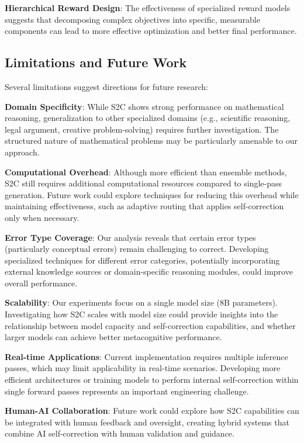 \documentclass[10pt,twocolumn]{article}
\newcommand{\ssc}{\textsc{S2C}}
\begin{document}
\textbf{Hierarchical Reward Design}: The effectiveness of specialized reward models suggests that decomposing complex objectives into specific, measurable components can lead to more effective optimization and better final performance.

\subsection{Limitations and Future Work}

Several limitations suggest directions for future research:

\textbf{Domain Specificity}: While \ssc{} shows strong performance on mathematical reasoning, generalization to other specialized domains (e.g., scientific reasoning, legal argument, creative problem-solving) requires further investigation. The structured nature of mathematical problems may be particularly amenable to our approach.

\textbf{Computational Overhead}: Although more efficient than ensemble methods, \ssc{} still requires additional computational resources compared to single-pass generation. Future work could explore techniques for reducing this overhead while maintaining effectiveness, such as adaptive routing that applies self-correction only when necessary.

\textbf{Error Type Coverage}: Our analysis reveals that certain error types (particularly conceptual errors) remain challenging to correct. Developing specialized techniques for different error categories, potentially incorporating external knowledge sources or domain-specific reasoning modules, could improve overall performance.

\textbf{Scalability}: Our experiments focus on a single model size (8B parameters). Investigating how \ssc{} scales with model size could provide insights into the relationship between model capacity and self-correction capabilities, and whether larger models can achieve better metacognitive performance.

\textbf{Real-time Applications}: Current implementation requires multiple inference passes, which may limit applicability in real-time scenarios. Developing more efficient architectures or training models to perform internal self-correction within single forward passes represents an important engineering challenge.

\textbf{Human-AI Collaboration}: Future work could explore how \ssc{} capabilities can be integrated with human feedback and oversight, creating hybrid systems that combine AI self-correction with human validation and guidance.
\end{document}
